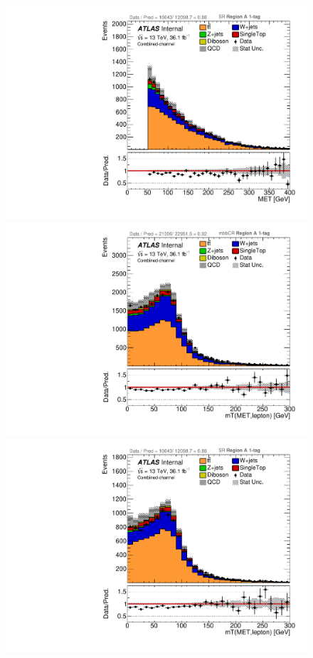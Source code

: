 \begin{figure}[!htbp]
\begin{center}
\includegraphics[scale=0.33]{./figures/boosted/ABCD_1tag0bjet/lepCombined_SR_RegionA_MET_withDD}        \\
\includegraphics[scale=0.33]{./figures/boosted/ABCD_1tag0bjet/lepCombined_mbbcr_RegionA_WlepMtATLAS_withDD}
\includegraphics[scale=0.33]{./figures/boosted/ABCD_1tag0bjet/lepCombined_SR_RegionA_WlepMtATLAS_withDD} \\

\end{center}
\end{figure}
